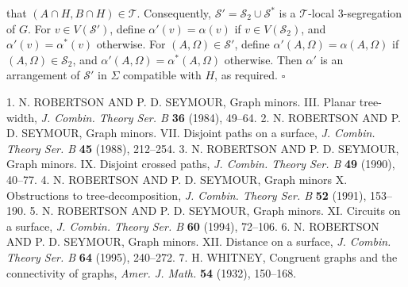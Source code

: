 \noindent that $(A \cap H, B \cap H) \in \mathscr{T}$. Consequently, $\mathscr{S}' = \mathscr{S}_2 \cup \mathscr{S}^*$ is a $\mathscr{T}$-local 3-segregation of $G$. For $v \in V(\mathscr{S}')$, define $\alpha'(v) = \alpha(v)$ if $v \in V(\mathscr{S}_2)$, and $\alpha'(v) = \alpha^*(v)$ otherwise. For $(A, \Omega) \in \mathscr{S}'$, define $\alpha'(A, \Omega) = \alpha(A, \Omega)$ if $(A, \Omega) \in \mathscr{S}_2$, and $\alpha'(A, \Omega) = \alpha^*(A, \Omega)$ otherwise. Then $\alpha'$ is an arrangement of $\mathscr{S}'$ in $\Sigma$ compatible with $H$, as required. $\square$


1. N. ROBERTSON AND P. D. SEYMOUR, Graph minors. III. Planar tree-width, \textit{J. Combin. Theory Ser. B} \textbf{36} (1984), 49--64. 2. N. ROBERTSON AND P. D. SEYMOUR, Graph minors. VII. Disjoint paths on a surface, \textit{J. Combin. Theory Ser. B} \textbf{45} (1988), 212--254. 3. N. ROBERTSON AND P. D. SEYMOUR, Graph minors. IX. Disjoint crossed paths, \textit{J. Combin. Theory Ser. B} \textbf{49} (1990), 40--77. 4. N. ROBERTSON AND P. D. SEYMOUR, Graph minors X. Obstructions to tree-decomposition, \textit{J. Combin. Theory Ser. B} \textbf{52} (1991), 153--190. 5. N. ROBERTSON AND P. D. SEYMOUR, Graph minors. XI. Circuits on a surface, \textit{J. Combin. Theory Ser. B} \textbf{60} (1994), 72--106. 6. N. ROBERTSON AND P. D. SEYMOUR, Graph minors. XII. Distance on a surface, \textit{J. Combin. Theory Ser. B} \textbf{64} (1995), 240--272. 7. H. WHITNEY, Congruent graphs and the connectivity of graphs, \textit{Amer. J. Math.} \textbf{54} (1932), 150--168.
